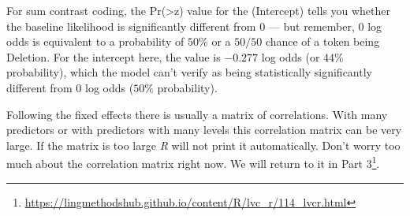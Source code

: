 \documentclass[
  10pt,
  letterpaper]{article}
\renewcommand\texttt[1]{{\ttfamily\color{BrickRed}#1}}
\DeclareRobustCommand{\href}[2]{#2\footnote{\url{#1}}}
\begin{document}
For sum contrast coding, the
\texttt{Pr(\textgreater{}\textbar{}z\textbar{})} value for the
\texttt{(Intercept)} tells you whether the baseline likelihood is
significantly different from \(0\) --- but remember, \(0\) log odds is
equivalent to a probability of \(50\%\) or a \(50/50\) chance of a token
being \texttt{Deletion}. For the intercept here, the value is \(-0.277\)
log odds (or \(44\%\) probability), which the model can't verify as
being statistically significantly different from \(0\) log odds
(\(50\%\) probability).

Following the fixed effects there is usually a matrix of correlations.
With many predictors or with predictors with many levels this
correlation matrix can be very large. If the matrix is too large
\emph{R} will not print it automatically. Don't worry too much about the
correlation matrix right now. We will return to it in
\href{https://lingmethodshub.github.io/content/R/lvc_r/114_lvcr.html}{Part
3}.
\end{document}
